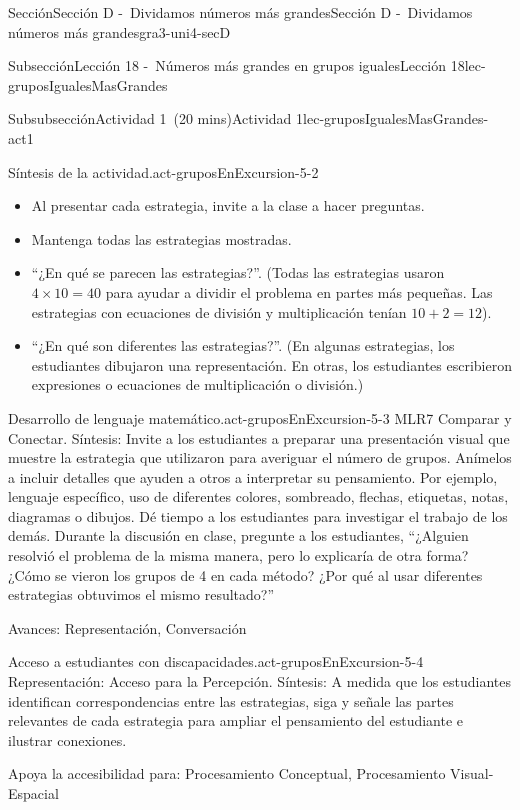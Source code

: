 \documentclass[oneside,10pt,]{article}
\begin{document}
\begin{sectionptx}{Sección}{Sección D -~Dividamos números más grandes}{}{Sección D -~Dividamos números más grandes}{}{}{gra3-uni4-secD}
\begin{subsectionptx}{Subsección}{Lección 18 -~Números más grandes en grupos iguales}{}{Lección 18}{}{}{lec-gruposIgualesMasGrandes}
\begin{subsubsectionptx}{Subsubsección}{Actividad 1~(20 mins)}{}{Actividad 1}{}{}{lec-gruposIgualesMasGrandes-act1}
\begin{paragraphs}{Síntesis de la actividad.}{act-gruposEnExcursion-5-2}
\begin{itemize}[label=\textbullet]
\item{}Al presentar cada estrategia, invite a la clase a hacer preguntas.%
\item{}Mantenga todas las estrategias mostradas.%
\item{}``¿En qué se parecen las estrategias?''. (Todas las estrategias usaron \(4\times 10 = 40\) para ayudar a dividir el problema en partes más pequeñas. Las estrategias con ecuaciones de división y multiplicación tenían \(10 + 2 = 12\)).%
\item{}``¿En qué son diferentes las estrategias?''. (En algunas estrategias, los estudiantes dibujaron una representación. En otras, los estudiantes escribieron expresiones o ecuaciones de multiplicación o división.)%
\end{itemize}
\end{paragraphs}%
\begin{paragraphs}{Desarrollo de lenguaje matemático.}{act-gruposEnExcursion-5-3}%
MLR7 Comparar y Conectar. Síntesis: Invite a los estudiantes a preparar una presentación visual que muestre la estrategia que utilizaron para averiguar el número de grupos. Anímelos a incluir detalles que ayuden a otros a interpretar su pensamiento. Por ejemplo, lenguaje específico, uso de diferentes colores, sombreado, flechas, etiquetas, notas, diagramas o dibujos. Dé tiempo a los estudiantes para investigar el trabajo de los demás. Durante la discusión en clase, pregunte a los estudiantes, ``¿Alguien resolvió el problema de la misma manera, pero lo explicaría de otra forma? ¿Cómo se vieron los grupos de 4 en cada método? ¿Por qué al usar diferentes estrategias obtuvimos el mismo resultado?''%
\par
Avances: Representación, Conversación%
\end{paragraphs}%
\begin{paragraphs}{Acceso a estudiantes con discapacidades.}{act-gruposEnExcursion-5-4}%
Representación: Acceso para la Percepción. Síntesis: A medida que los estudiantes identifican correspondencias entre las estrategias, siga y señale las partes relevantes de cada estrategia para ampliar el pensamiento del estudiante e ilustrar conexiones.%
\par
Apoya la accesibilidad para: Procesamiento Conceptual, Procesamiento Visual-Espacial%
\end{paragraphs}%
\end{subsubsectionptx}
%
%
\typeout{************************************************}
\typeout{************************************************}

\end{subsectionptx}
\end{sectionptx}
\end{document}
